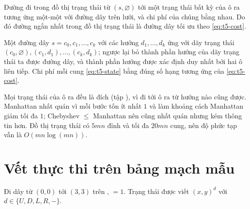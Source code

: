 \begin{dinhly}
  Đường đi trong đồ thị trạng thái từ $(s, \varnothing)$ tới một trạng thái bất kỳ của ô ra tương
  ứng một-một với đường dây trên lưới, và chi phí của chúng bằng nhau. Do đó đường ngắn nhất trong
  đồ thị trạng thái là đường dây tối ưu theo \eqref{eq:t5-cost}.
\end{dinhly}

\begin{loigiai}
  Một đường dây $s = c_0, c_1, \dots, c_k$ với các hướng $d_1, \dots, d_k$ ứng với dãy trạng thái
  $(c_0, \varnothing), (c_1, d_1), \dots, (c_k, d_k)$; ngược lại bỏ thành phần hướng của dãy trạng
  thái ta được đường dây, và thành phần hướng được xác định duy nhất bởi hai ô liên tiếp. Chi phí
  mỗi cung \eqref{eq:t5-state} bằng đúng số hạng tương ứng của \eqref{eq:t5-cost}.
\end{loigiai}

Mọi trạng thái của ô ra đều là đích (tập ), vì đi tới ô ra từ hướng nào cũng được.
Manhattan nhất quán vì mỗi bước tốn ít nhất $1$ và làm khoảng cách Manhattan giảm tối đa $1$;
Chebyshev $\le$ Manhattan nên cũng nhất quán nhưng kém thông tin hơn. Đồ thị trạng thái có
$5mn$ đỉnh và tối đa $20mn$ cung, nên độ phức tạp vẫn là $O(mn \log(mn))$.

\section{Vết thực thi trên bảng mạch mẫu}
\label{sec:t5-vet}

Đi dây từ $(0,0)$ tới $(3,3)$ trên ,  $= 1$. Trạng thái được viết
$(x,y)^{d}$ với $d \in \{U, D, L, R, -\}$.

